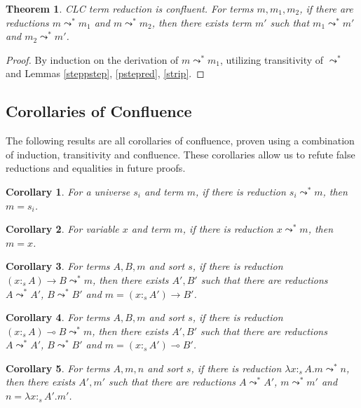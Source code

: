 \documentclass{article}
\newtheorem{theorem}{Theorem}[section]
\newtheorem{corollary}{Corollary}[theorem]
\theoremstyle{definition}
\newcommand{\stype}[1]{:_{#1}}
\newcommand{\red}{\leadsto^*}
\begin{document}
\begin{theorem}
  CLC term reduction is confluent. For terms $m, m_1, m_2$, if there are reductions $m \red m_1$ and $m \red m_2$, then there exists term $m'$ such that $m_1 \red m'$ and $m_2 \red m'$.
\end{theorem}
\begin{proof}
  By induction on the derivation of $m \red m_1$, utilizing transitivity of $\red$ and Lemmas \ref{steppstep}, \ref{pstepred}, \ref{strip}.
\end{proof}

\subsection{Corollaries of Confluence}
The following results are all corollaries of confluence, proven using a combination of induction, transitivity and confluence. These corollaries allow us to refute false reductions and equalities in future proofs.

\begin{corollary}\label{redsortinv}
  For a universe $s_i$ and term $m$, if there is reduction $s_i \red m$, then $m = s_i$.
\end{corollary}

\begin{corollary}\label{redvarinv}
  For variable $x$ and term $m$, if there is reduction $x \red m$, then $m = x$.
\end{corollary}

\begin{corollary}\label{redarrowinv}
  For terms $A, B, m$ and sort $s$, if there is reduction $(x \stype{s} A) \rightarrow B \red m$, then there exists $A', B'$ such that there are reductions $A \red A'$, $B \red B'$ and $m = (x \stype{s} A') \rightarrow B'$.
\end{corollary}

\begin{corollary}\label{redlolliinv}
  For terms $A, B, m$ and sort $s$, if there is reduction $(x \stype{s} A) \multimap B \red m$, then there exists $A', B'$ such that there are reductions $A \red A'$, $B \red B'$ and $m = (x \stype{s} A') \multimap B'$.
\end{corollary}

\begin{corollary}\label{redlaminv}
  For terms $A, m, n$ and sort $s$, if there is reduction $\lambda x \stype{s} A.m \red n$, then there exists $A',m'$ such that there are reductions $A \red A'$, $m \red m'$ and $n = \lambda x \stype{s} A'.m'$.
\end{corollary}
\end{document}
